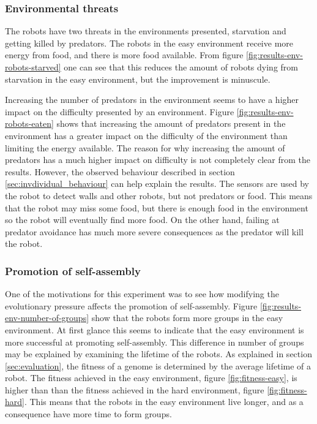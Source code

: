 \subsubsection{Environmental threats}
The robots have two threats in the environments presented, starvation and getting killed by predators.
The robots in the easy environment receive more energy from food, and there is more food available.
From figure \ref{fig:results-env-robots-starved} one can see that this reduces the amount of robots dying from starvation in the easy environment, but the improvement is minuscule.

Increasing the number of predators in the environment seems to have a higher impact on the difficulty presented by an environment.
Figure \ref{fig:results-env-robots-eaten} shows that increasing the amount of predators present in the environment has a greater impact on the difficulty of the environment than limiting the energy available.
The reason for why increasing the amount of predators has a much higher impact on difficulty is not completely clear from the results.
However, the observed behaviour described in section \ref{sec:invdividual_behaviour} can help explain the results.
The sensors are used by the robot to detect walls and other robots, but not predators or food.
This means that the robot may miss some food, but there is enough food in the environment so the robot will eventually find more food.
On the other hand, failing at predator avoidance has much more severe consequences as the predator will kill the robot.

\subsubsection{Promotion of self-assembly}
One of the motivations for this experiment was to see how modifying the evolutionary pressure affects the promotion of self-assembly.
Figure \ref{fig:results-env-number-of-groups} show that the robots form more groups in the easy environment.
At first glance this seems to indicate that the easy environment is more successful at promoting self-assembly.
This difference in number of groups may be explained by examining the lifetime of the robots.
As explained in section \ref{sec:evaluation}, the fitness of a genome is determined by the average lifetime of a robot.
The fitness achieved in the easy environment, figure \ref{fig:fitness-easy}, is higher than than the fitness achieved in the hard environment, figure \ref{fig:fitness-hard}.
This means that the robots in the easy environment live longer, and as a consequence have more time to form groups.

